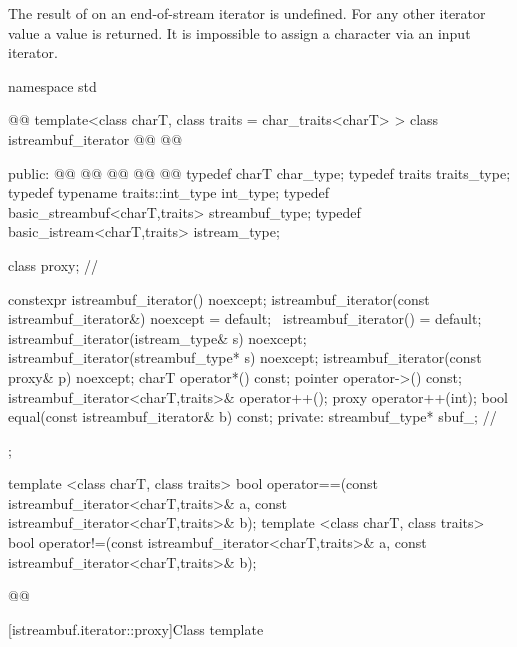 \pnum
The result of
on an end-of-stream iterator is undefined.
%
For any other iterator value a
value is returned.
It is impossible to assign a character via an input iterator.

%
\begin{codeblock}
namespace std { @@
  template<class charT, class traits = char_traits<charT> >
  class istreambuf_iterator
     @@
                       @@ {
  public:
    @@
    @@
    @@
    @@
    @@
    typedef charT                         char_type;
    typedef traits                        traits_type;
    typedef typename traits::int_type     int_type;
    typedef basic_streambuf<charT,traits> streambuf_type;
    typedef basic_istream<charT,traits>   istream_type;

    class proxy;                          // \expos

    constexpr istreambuf_iterator() noexcept;
    istreambuf_iterator(const istreambuf_iterator&) noexcept = default;
    ~istreambuf_iterator() = default;
    istreambuf_iterator(istream_type& s) noexcept;
    istreambuf_iterator(streambuf_type* s) noexcept;
    istreambuf_iterator(const proxy& p) noexcept;
    charT operator*() const;
    pointer operator->() const;
    istreambuf_iterator<charT,traits>& operator++();
    proxy operator++(int);
    bool equal(const istreambuf_iterator& b) const;
  private:
    streambuf_type* sbuf_;                // \expos
  };

  template <class charT, class traits>
    bool operator==(const istreambuf_iterator<charT,traits>& a,
            const istreambuf_iterator<charT,traits>& b);
  template <class charT, class traits>
    bool operator!=(const istreambuf_iterator<charT,traits>& a,
            const istreambuf_iterator<charT,traits>& b);
}@\newtxt{\}\}\}}@
\end{codeblock}

[istreambuf.iterator::proxy]{Class template }

